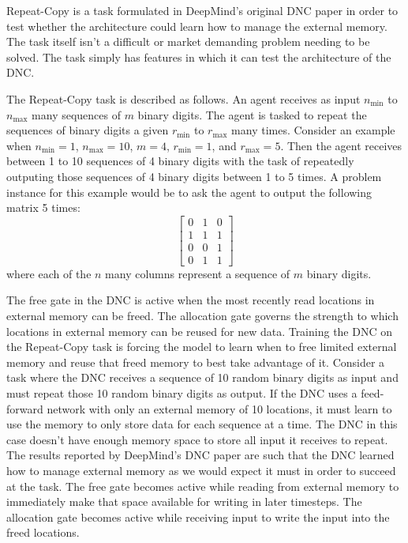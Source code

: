 Repeat-Copy is a task formulated in DeepMind's original DNC paper
\cite{graves2016hybrid} in order to test whether the architecture could
learn how to manage the external memory. The task itself isn't a difficult or
market demanding problem needing to be solved. The task simply has features in
which it can test the architecture of the DNC.

The Repeat-Copy task is described as follows. An agent receives as input
$n_{\textrm{min}}$ to $n_{\textrm{max}}$ many sequences of $m$ binary digits.
The agent is tasked to repeat the sequences of binary digits a given
$r_{\textrm{min}}$ to $r_{\textrm{max}}$ many times. Consider an example when
$n_{\textrm{min}} = 1$, $n_{\textrm{max}} = 10$, $m = 4$,
$r_{\textrm{min}} = 1$, and $r_{\textrm{max}} = 5$.
Then the agent receives between 1 to 10 sequences of 4 binary digits with
the task of repeatedly outputing those sequences of 4 binary digits between 1
to 5 times. A problem instance for this example would be to ask the agent to
output the following matrix 5 times:
$$
\begin{bmatrix}
    0 & 1 & 0 \\
    1 & 1 & 1 \\
    0 & 0 & 1 \\
    0 & 1 & 1
\end{bmatrix}
$$
where each of the $n$ many columns represent a sequence of $m$ binary digits.

The free gate in the DNC is active when the most recently read locations in
external memory can be freed. The allocation gate governs the strength to which
locations in external memory can be reused for new data. Training the DNC on
the Repeat-Copy task is forcing the model to learn when to free limited
external memory and reuse that freed memory to best take advantage of it.
Consider a task where the DNC receives a sequence of 10 random binary digits as
input and must repeat those 10 random binary digits as output. If the DNC uses
a feed-forward network with only an external memory of 10 locations, it must
learn to use the memory to only store data for each sequence at a time. The
DNC in this case doesn't have enough memory space to store all input it
receives to repeat. The results reported by DeepMind's DNC paper
\cite{graves2016hybrid} are such that the DNC learned how to manage external
memory as we would expect it must in order to succeed at the task. The free
gate becomes active while reading from external memory to immediately make that
space available for writing in later timesteps. The allocation gate becomes
active while receiving input to write the input into the freed locations.

